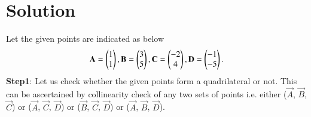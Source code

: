 \documentclass[journal,12pt,twocolumn]{IEEEtran}
\begin{document}
\section{Solution}
Let the given points are indicated as below\\
\begin{align}
\begin{split}
\mathbf{A} = \begin{pmatrix}1 \\ 1\end{pmatrix}, 
\mathbf{B} = \begin{pmatrix}3 \\ 5\end{pmatrix}, 
\mathbf{C} = \begin{pmatrix}-2 \\ 4\end{pmatrix}, 
\mathbf{D} = \begin{pmatrix}-1 \\ -5\end{pmatrix}. 
\end{split}
\end{align}
\textbf{Step1}: Let us check whether the given points form a quadrilateral or not. This can be ascertained by collinearity check of any two sets of points i.e. 
either
($\vec{A}$, $\vec{B}$, $\vec{C}$) or ($\vec{A}$, $\vec{C}$, $\vec{D}$) or ($\vec{B}$, $\vec{C}$, $\vec{D}$) or ($\vec{A}$, $\vec{B}$, $\vec{D}$).
\\
\end{document}

